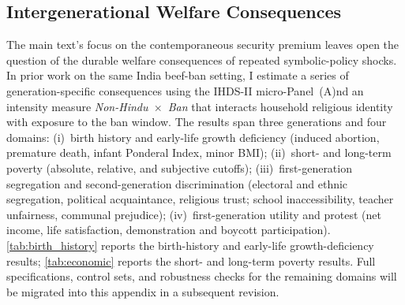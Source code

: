 \documentclass[11pt,twoside]{extarticle}
\begin{document}
\subsection{Intergenerational Welfare Consequences} \label{app:intergenerational}

The main text's focus on the contemporaneous security premium leaves open the
question of the durable welfare consequences of repeated symbolic-policy
shocks. In prior work on the same India beef-ban setting, I estimate a series
of generation-specific consequences using the IHDS-II micro-Panel~(A)nd an
intensity measure \textit{Non-Hindu~$\times$~Ban} that interacts household
religious identity with exposure to the ban window. The results span three
generations and four domains: (i)~birth history and early-life growth
deficiency (induced abortion, premature death, infant Ponderal Index, minor
BMI); (ii)~short- and long-term poverty (absolute, relative, and subjective
cutoffs); (iii)~first-generation segregation and second-generation
discrimination (electoral and ethnic segregation, political acquaintance,
religious trust; school inaccessibility, teacher unfairness, communal
prejudice); (iv)~first-generation utility and protest (net income, life
satisfaction, demonstration and boycott participation). \autoref{tab:birth_history} reports the birth-history and early-life growth-deficiency results; \autoref{tab:economic} reports the short- and long-term poverty results. Full specifications, control sets, and robustness checks for the remaining domains will be migrated into this appendix in a subsequent revision.
\end{document}
